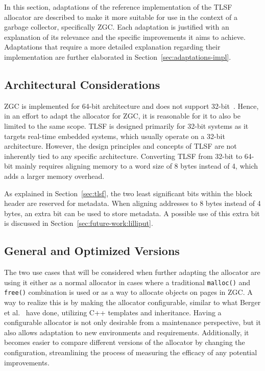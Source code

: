 
In this section, adaptations of the reference implementation of the TLSF allocator are described to make it more suitable for use in the context of a garbage collector, specifically ZGC. Each adaptation is justified with an explanation of its relevance and the specific improvements it aims to achieve. Adaptations that require a more detailed explanation regarding their implementation are further elaborated in Section~\ref{sec:adaptations-impl}.

\subsection{Architectural Considerations}
\label{sec:adaptations:architectural-considerations}

ZGC is implemented for 64-bit architecture and does not support 32-bit~\cite{zgc:deep_dive}. Hence, in an effort to adapt the allocator for ZGC, it is reasonable for it to also be limited to the same scope. TLSF is designed primarily for 32-bit systems as it targets real-time embedded systems, which usually operate on a 32-bit architecture. However, the design principles and concepts of TLSF are not inherently tied to any specific architecture. Converting TLSF from 32-bit to 64-bit mainly requires aligning memory to a word size of 8 bytes instead of 4, which adds a larger memory overhead.

As explained in Section~\ref{sec:tlsf}, the two least significant bits within the block header are reserved for metadata. When aligning addresses to 8 bytes instead of 4 bytes, an extra bit can be used to store metadata. A possible use of this extra bit is discussed in Section~\ref{sec:future-work:lilliput}.

\subsection{General and Optimized Versions}

The two use cases that will be considered when further adapting the allocator are using it either as a normal allocator in cases where a traditional \texttt{malloc()} and \texttt{free()} combination is used or as a way to allocate objects on pages in ZGC. A way to realize this is by making the allocator configurable, similar to what Berger et al.~\cite{configurable_allocator} have done, utilizing C++ templates and inheritance. Having a configurable allocator is not only desirable from a maintenance perspective, but it also allows adaptation to new environments and requirements. Additionally, it becomes easier to compare different versions of the allocator by changing the configuration, streamlining the process of measuring the efficacy of any potential improvements.

